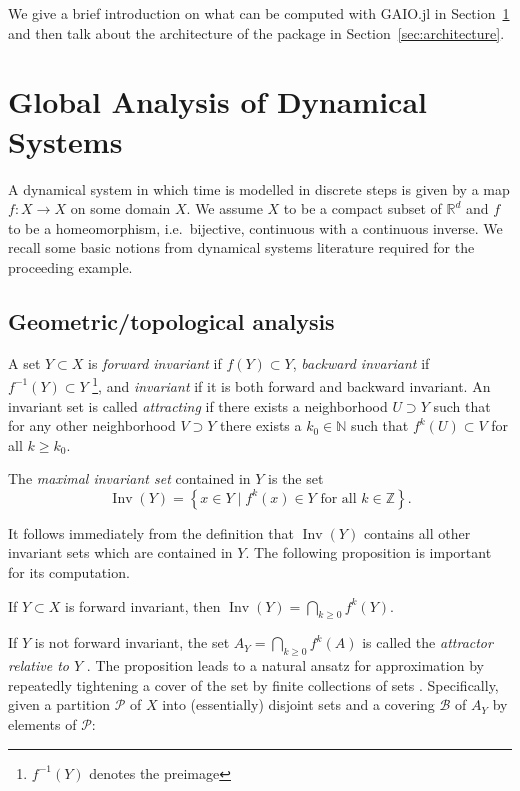 \documentclass{juliacon}
\newcommand{\R}{{\mathbb R}}
\newcommand{\N}{{\mathbb N}}
\newcommand{\Z}{{\mathbb Z}}
\newcommand{\cB}{\mathcal{B}}
\newcommand{\cP}{\mathcal{P}}
\newcommand{\Inv}{\mathop{\mathrm{Inv}}}
\begin{document}
We give a brief introduction on what can be computed with GAIO.jl in Section~\ref{sec:computations} and then talk about the architecture of the package in Section~\ref{sec:architecture}.

\eject

\section{Global Analysis of Dynamical Systems}
\label{sec:computations}

A dynamical system in which time is modelled in discrete steps is given by a map $f : X \to X$ on some domain $X$. We assume $X$ to be a compact subset of $\R^d$ and $f$ to be a homeomorphism, i.e.\ bijective, continuous with a continuous inverse. We recall some basic notions from dynamical systems literature required for the proceeding example. 

\subsection{Geometric/topological analysis}\label{sec:attractors}

A set $Y \subset X$ is \emph{forward invariant} if $f(Y) \subset Y$, \emph{backward invariant} if $f^{-1}(Y) \subset Y$ \footnote{$f^{-1}(Y)$ denotes the preimage}, and \emph{invariant} if it is both forward and backward invariant. An invariant set is called \emph{attracting} if there exists a neighborhood $U \supset Y$ such that for any other neighborhood $V \supset Y$ there exists a $k_0 \in \N$ such that $f^k (U) \subset V$ for all $k\geq k_0$. 

The \emph{maximal invariant set} contained in $Y$ is the set 
    \begin{equation}
        \Inv (Y) = \left\{ x \in Y \mid f^k(x) \in Y \text{ for all } k\in\Z \right\}.
    \end{equation}

It follows immediately from the definition that $\Inv (Y)$ contains all other invariant sets which are contained in $Y$. The following proposition is important for its computation. 

\begin{proposition}
    \cite{maxinvset}
    If $Y \subset X$ is forward invariant, then $\Inv (Y) = \bigcap_{k \geq 0} f^k (Y)$. 
\end{proposition}

If $Y$ is not forward invariant, the set $A_Y=\bigcap_{k \geq 0} f^k (A)$ is called the \emph{attractor relative to $Y$} \cite{DeHo:97}. The proposition leads to a natural ansatz for approximation by repeatedly tightening a cover of the set by finite collections of sets \cite{DeHo:97}. Specifically, given a partition $\cP$ of $X$ into (essentially) disjoint sets and a covering $\cB$ of $A_Y$ by elements of $\cP$:
\end{document}
